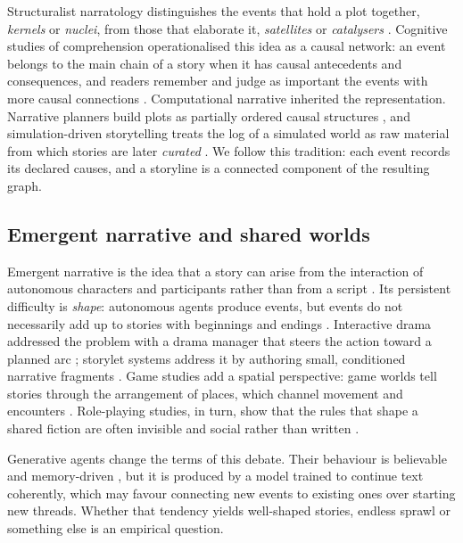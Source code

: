 \documentclass[12pt]{article}
\begin{document}
Structuralist narratology distinguishes the events that hold a plot
together, \emph{kernels} or \emph{nuclei}, from those that elaborate it,
\emph{satellites} or \emph{catalysers}
\parencite{barthes1975,chatman1978}. Cognitive studies of comprehension
operationalised this idea as a causal network: an event belongs to the main
chain of a story when it has causal antecedents and consequences, and
readers remember and judge as important the events with more causal
connections \parencite{trabasso1985}. Computational narrative inherited the
representation. Narrative planners build plots as partially ordered causal
structures \parencite{riedl2010}, and simulation-driven storytelling treats
the log of a simulated world as raw material from which stories are later
\emph{curated} \parencite{ryan2018}. We follow this tradition: each event
records its declared causes, and a storyline is a connected component of the
resulting graph.

\subsection{Emergent narrative and shared worlds}

Emergent narrative is the idea that a story can arise from the interaction
of autonomous characters and participants rather than from a script
\parencite{aylett1999,louchart2004}. Its persistent difficulty is
\emph{shape}: autonomous agents produce events, but events do not
necessarily add up to stories with beginnings and endings
\parencite{riedl2013}. Interactive drama addressed the problem with a drama
manager that steers the action toward a planned arc \parencite{mateas2003};
storylet systems address it by authoring small, conditioned narrative
fragments \parencite{kreminski2018}. Game studies add a spatial perspective:
game worlds tell stories through the arrangement of places, which channel
movement and encounters \parencite{jenkins2004}. Role-playing studies, in
turn, show that the rules that shape a shared fiction are often invisible
and social rather than written \parencite{montola2008,fine1983}.

Generative agents change the terms of this debate. Their behaviour is
believable and memory-driven \parencite{park2023}, but it is produced by a
model trained to continue text coherently, which may favour connecting new
events to existing ones over starting new threads. Whether that tendency
yields well-shaped stories, endless sprawl or something else is an empirical
question.
\end{document}
